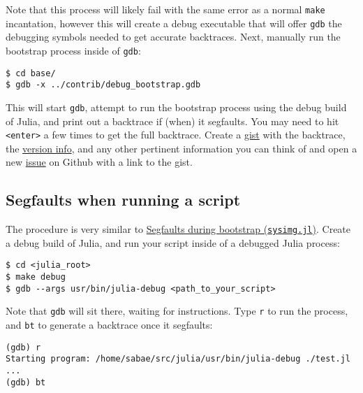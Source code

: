 Note that this process will likely fail with the same error as a normal \texttt{make} incantation, however this will create a debug executable that will offer \texttt{gdb} the debugging symbols needed to get accurate backtraces.  Next, manually run the bootstrap process inside of \texttt{gdb}:




\begin{lstlisting}
$ cd base/
$ gdb -x ../contrib/debug_bootstrap.gdb
\end{lstlisting}



This will start \texttt{gdb}, attempt to run the bootstrap process using the debug build of Julia, and print out a backtrace if (when) it segfaults.  You may need to hit \texttt{<enter>} a few times to get the full backtrace.  Create a \href{https://gist.github.com}{gist} with the backtrace, the \hyperlink{4601189142062189569}{version info}, and any other pertinent information you can think of and open a new \href{https://github.com/JuliaLang/julia/issues?q=is\%3Aopen}{issue} on Github with a link to the gist.



\hypertarget{17337880191991868567}{}


\subsection{Segfaults when running a script}



The procedure is very similar to \hyperlink{13671941627037387928}{Segfaults during bootstrap (\texttt{sysimg.jl})}.  Create a debug build of Julia, and run your script inside of a debugged Julia process:




\begin{lstlisting}
$ cd <julia_root>
$ make debug
$ gdb --args usr/bin/julia-debug <path_to_your_script>
\end{lstlisting}



Note that \texttt{gdb} will sit there, waiting for instructions.  Type \texttt{r} to run the process, and \texttt{bt} to generate a backtrace once it segfaults:




\begin{lstlisting}
(gdb) r
Starting program: /home/sabae/src/julia/usr/bin/julia-debug ./test.jl
...
(gdb) bt
\end{lstlisting}



